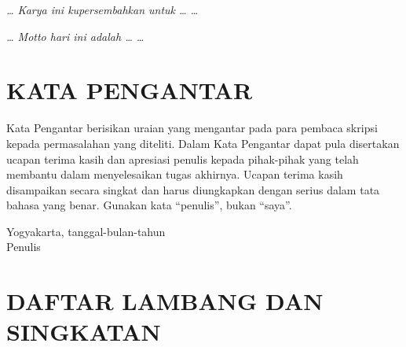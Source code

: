 \documentclass[
  indonesian,
  12pt,
  a4paper,
]{report}
\newcommand{\kotatanggal}{Yogyakarta, tanggal-bulan-tahun}
\renewcommand*\contentsname{Daftar Isi}
\newcommand\contentsname{Daftar Isi}
\renewcommand*\listfigurename{Daftar Gambar}
\newcommand\listfigurename{Daftar Gambar}
\renewcommand*\listtablename{Daftar Tabel}
\newcommand\listtablename{Daftar Tabel}
\begin{document}
\vspace*{1cm}
\begin{center}
\itshape \ldots{} Karya ini kupersembahkan untuk \ldots{} \ldots{}
\end{center}
\clearpage

\vspace*{1cm}
\begin{center}
\itshape \ldots{} Motto hari ini adalah \ldots{} \ldots{}
\end{center}
\clearpage

\chapter*{KATA PENGANTAR}\label{kata-pengantar}

Kata Pengantar berisikan uraian yang mengantar pada para pembaca skripsi
kepada permasalahan yang diteliti. Dalam Kata Pengantar dapat pula
disertakan ucapan terima kasih dan apresiasi penulis kepada pihak-pihak
yang telah membantu dalam menyelesaikan tugas akhirnya. Ucapan terima
kasih disampaikan secara singkat dan harus diungkapkan dengan serius
dalam tata bahasa yang benar. Gunakan kata ``penulis'', bukan ``saya''.

\vspace{1cm}
\begin{flushright}
\kotatanggal\\[1.2cm]
Penulis
\end{flushright}
\clearpage

\begin{singlespace}
\renewcommand{\contentsname}{DAFTAR ISI}
\tableofcontents
\clearpage

\renewcommand{\listtablename}{DAFTAR TABEL}
\listoftables
\clearpage

\renewcommand{\listfigurename}{DAFTAR GAMBAR}
\listoffigures
\clearpage
\end{singlespace}

\chapter*{DAFTAR LAMBANG DAN
SINGKATAN}\label{daftar-lambang-dan-singkatan}
\end{document}
